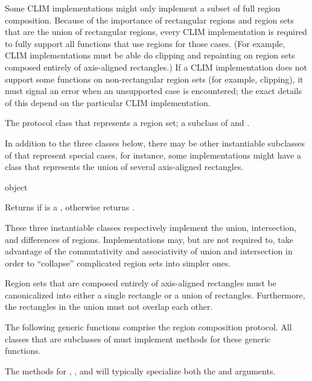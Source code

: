 Some CLIM implementations might only implement a subset of full region
composition.  Because of the importance of rectangular regions and region sets
that are the union of rectangular regions, every CLIM implementation is required
to fully support all functions that use regions for those cases.  (For example,
CLIM implementations must be able do clipping and repainting on region sets
composed entirely of axis-aligned rectangles.)  If a CLIM implementation does
not support some functions on non-rectangular region sets (for example,
clipping), it must signal an error when an unsupported case is encountered;
the exact details of this depend on the particular CLIM implementation.


The protocol class that represents a region set; a subclass of  and
.

In addition to the three classes below, there may be other instantiable
subclasses of  that represent special cases, for instance, some
implementations might have a  class that represents
the union of several axis-aligned rectangles.

\Immutable

 {object}

Returns  if  is a , otherwise returns
.


These three instantiable classes respectively implement the union, intersection,
and differences of regions.  Implementations may, but are not required to, take
advantage of the commutativity and associativity of union and intersection in
order to ``collapse'' complicated region sets into simpler ones.

Region sets that are composed entirely of axis-aligned rectangles must be
canonicalized into either a single rectangle or a union of rectangles.
Furthermore, the rectangles in the union must not overlap each other.


The following generic functions comprise the region composition protocol.  All
classes that are subclasses of  must implement methods for these
generic functions.

The methods for , , and
 will typically specialize both the  and
 arguments.


